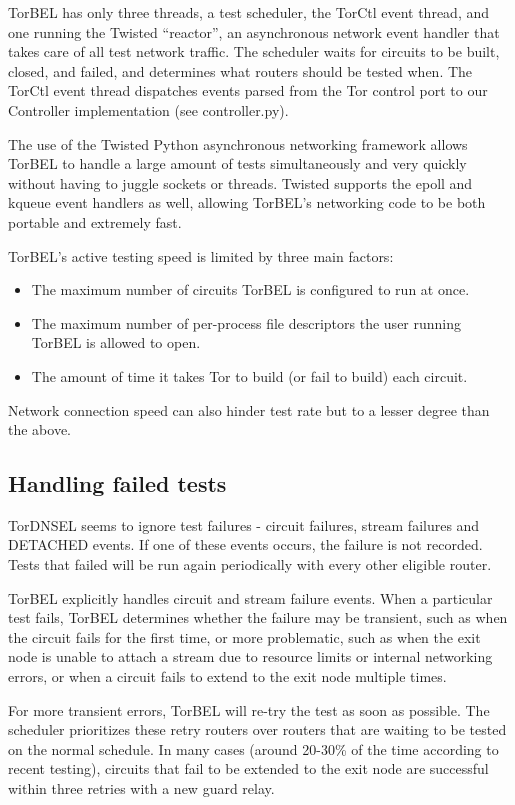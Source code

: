 \documentclass{article}
\begin{document}
TorBEL has only three threads, a test scheduler, the TorCtl event
thread, and one running the Twisted ``reactor'', an asynchronous
network event handler that takes care of all test network traffic. The
scheduler waits for circuits to be built, closed, and failed, and
determines what routers should be tested when.  The TorCtl event
thread dispatches events parsed from the Tor control port to our
Controller implementation (see controller.py).

The use of the Twisted Python asynchronous networking framework
allows TorBEL to handle a large amount of tests simultaneously
and very quickly without having to juggle sockets or threads.
Twisted supports the epoll and kqueue event handlers as well,
allowing TorBEL's networking code to be both portable and
extremely fast.

TorBEL's active testing speed is limited by three main factors:
\begin{itemize}
\item The maximum number of circuits TorBEL is configured to run at
  once.
\item The maximum number of per-process file descriptors the user
  running TorBEL is allowed to open.
\item The amount of time it takes Tor to build (or fail to build) each
  circuit.
\end{itemize}

Network connection speed can also hinder test rate but to a lesser
degree than the above.

\subsection{Handling failed tests}
TorDNSEL seems to ignore test failures - circuit failures, stream
failures and DETACHED events.  If one of these events occurs, the
failure is not recorded.  Tests that failed will be run again
periodically with every other eligible router.

TorBEL explicitly handles circuit and stream failure events.
When a particular test fails, TorBEL determines whether the failure
may be transient, such as when the circuit fails for the first time,
or more problematic, such as when the exit node is unable to attach
a stream due to resource limits or internal networking errors, or
when a circuit fails to extend to the exit node multiple times.

For more transient errors, TorBEL will re-try the test as soon
as possible.  The scheduler prioritizes these retry routers over
routers that are waiting to be tested on the normal schedule.
In many cases (around 20-30\% of the time according to recent testing),
circuits that fail to be extended to the exit node are successful within
three retries with a new guard relay.
\end{document}
